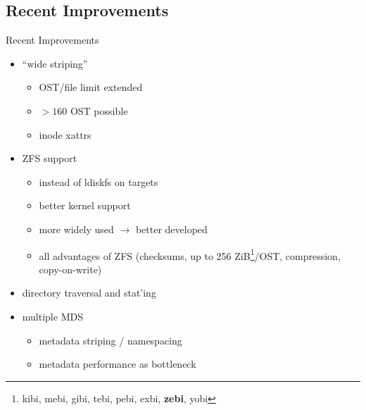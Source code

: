 \subsection{Recent Improvements}
\begin{frame}{Recent Improvements}
    \begin{itemize}
        \item ``wide striping''
            \begin{itemize}
                \item OST/file limit extended
                \item $> 160$ OST possible
                \item inode xattrs
            \end{itemize}
        \item ZFS support
            \begin{itemize}
                \item instead of ldiskfs on targets
                \item better kernel support
                \item more widely used $\rightarrow$ better developed
                \item all advantages of ZFS (checksums, up to 256 ZiB\footnote{kibi, mebi, gibi, tebi, pebi, exbi, \textbf{zebi}, yobi}/OST, compression, copy-on-write) \cite{zfs}
            \end{itemize}
        \item directory traversal and stat'ing
        \item multiple MDS
            \begin{itemize}
                \item metadata striping / namespacing
                \item metadata performance as bottleneck
            \end{itemize}
    \end{itemize}
\end{frame}

